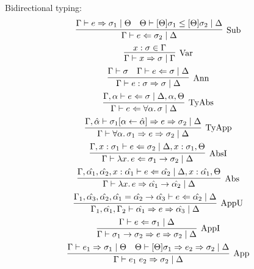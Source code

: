 Bidirectional typing:
\begin{gather*}
  \infer[\text{Sub}]{\Gamma \vdash e \Leftarrow \sigma_2 \mid \Delta}{
    \Gamma \vdash e \Rightarrow \sigma_1 \mid \Theta
    &
    \Theta \vdash [\Theta]\sigma_1 \leq [\Theta]\sigma_2 \mid \Delta
  }
  \\
  \infer[\text{Var}]{\Gamma \vdash x \Rightarrow \sigma \mid \Gamma}{
    x: \sigma \in \Gamma
  }
  \\
  \infer[\text{Ann}]{\Gamma \vdash e: \sigma \Rightarrow \sigma \mid \Delta}{
    \Gamma \vdash \sigma
    &
    \Gamma \vdash e \Leftarrow \sigma \mid \Delta
  }
  \\
  \infer[\text{TyAbs}]{\Gamma \vdash e \Leftarrow \forall \alpha\ldotp \sigma \mid \Delta}{
    \Gamma,\alpha \vdash e \Leftarrow \sigma \mid \Delta, \alpha, \Theta
  }
  \\
  \infer[\text{TyApp}]{\Gamma \vdash \forall \alpha\ldotp \sigma_1 \Rightarrow e \Rightarrow \sigma_2 \mid \Delta}{
    \Gamma,\hat{\alpha} \vdash \sigma_1[\alpha \assign \hat{\alpha}] \Rightarrow e \Rightarrow \sigma_2 \mid \Delta
  }
  \\
  \infer[\text{AbsI}]{\Gamma \vdash \lambda x\ldotp e \Leftarrow \sigma_1 \to \sigma_2 \mid \Delta}{
    \Gamma, x: \sigma_1 \vdash e \Leftarrow \sigma_2 \mid \Delta, x: \sigma_1, \Theta
  }
  \\
  \infer[\text{Abs}]{\Gamma \vdash \lambda x\ldotp e \Rightarrow \hat{\alpha_1} \to \hat{\alpha_2} \mid \Delta}{
    \Gamma, \hat{\alpha_1}, \hat{\alpha_2}, x: \hat{\alpha_1} \vdash e \Leftarrow \hat{\alpha_2} \mid \Delta, x: \hat{\alpha_1}, \Theta
  }
  \\
  \infer[\text{AppU}]{\Gamma_1, \hat{\alpha_1}, \Gamma_2 \vdash \hat{\alpha_1} \Rightarrow e \Rightarrow \hat{\alpha_3} \mid \Delta}{
    \Gamma_1, \hat{\alpha_3}, \hat{\alpha_2}, \hat{\alpha_1} = \hat{\alpha_2} \to \hat{\alpha_3} \vdash e \Leftarrow \hat{\alpha_2} \mid \Delta
  }
  \\
  \infer[\text{AppI}]{\Gamma \vdash \sigma_1 \to \sigma_2 \Rightarrow e \Rightarrow \sigma_2 \mid \Delta}{
    \Gamma \vdash e \Leftarrow \sigma_1 \mid \Delta
  }
  \\
  \infer[\text{App}]{\Gamma \vdash e_1\; e_2 \Rightarrow \sigma_2 \mid \Delta}{
    \Gamma \vdash e_1 \Rightarrow \sigma_1 \mid \Theta
    &
    \Theta \vdash [\Theta]\sigma_1 \Rightarrow e_2 \Rightarrow \sigma_2 \mid \Delta
  }
\end{gather*}

